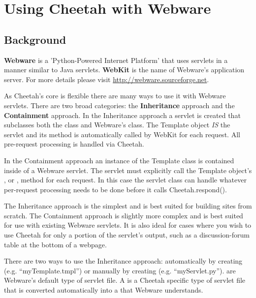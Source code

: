 \section{Using Cheetah with Webware}
\label{webware}

\subsection{Background}
\label{webware.background}

{\bf Webware} is a 'Python-Powered Internet Platform' that uses servlets in a
manner similar to Java servlets.  {\bf WebKit} is the name of Webware's
application server.  For more details please visit
\url{http://webware.sourceforge.net}.

As Cheetah's core is flexible there are many ways to use it with Webware
servlets.  There are two broad categories: the {\bf Inheritance} approach and the
{\bf Containment} approach.  In the Inheritance approach a servlet is created that
subclasses both the  class and Webware's 
class.  The Template object {\em IS} the servlet and its  method is
automatically called by WebKit for each request.  All pre-request processing is
handled via Cheetah.

In the Containment approach an instance of the Template class is contained
inside of a Webware servlet.  The servlet must explicitly call the Template
object's , or , method for each request.  In
this case the servlet class can handle whatever per-request processing needs to
be done before it calls Cheetah.respond().

The Inheritance approach is the simplest and is best suited for building sites
from scratch. The Containment approach is slightly more complex and is best
suited for use with existing Webware servlets.  It is also ideal for cases where
you wish to use Cheetah for only a portion of the servlet's output, such as a
discussion-forum table at the bottom of a webpage.

There are two ways to use the Inheritance approach: automatically by creating
{\bf {}} (e.g. ``myTemplate.tmpl'') or manually by
creating {\bf {}} (e.g. ``myServlet.py'').  are Webware's default type of servlet file.  A  is a Cheetah specific type of servlet file that is converted
automatically into a  that Webware understands.

